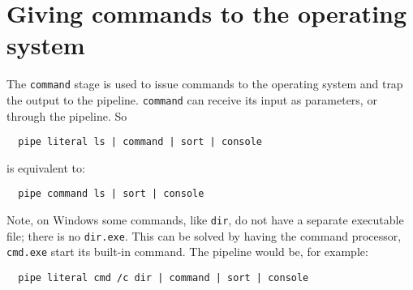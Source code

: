 \section{Giving commands to the operating system}

The \texttt{command} stage is used to issue commands to the operating
system and trap the output to the pipeline. \texttt{command} can
receive its input as parameters, or through the pipeline. So
\begin{lstlisting}
  pipe literal ls | command | sort | console
\end{lstlisting}
is equivalent to:
\begin{lstlisting}
  pipe command ls | sort | console
\end{lstlisting}


Note, on Windows some commands, like \texttt{dir}, do not have a separate
executable file; there is no \texttt{dir.exe}. This can be solved by
having the command processor, \texttt{cmd.exe} start its built-in
command. The pipeline would be, for example:
\begin{lstlisting}
  pipe literal cmd /c dir | command | sort | console
\end{lstlisting}

